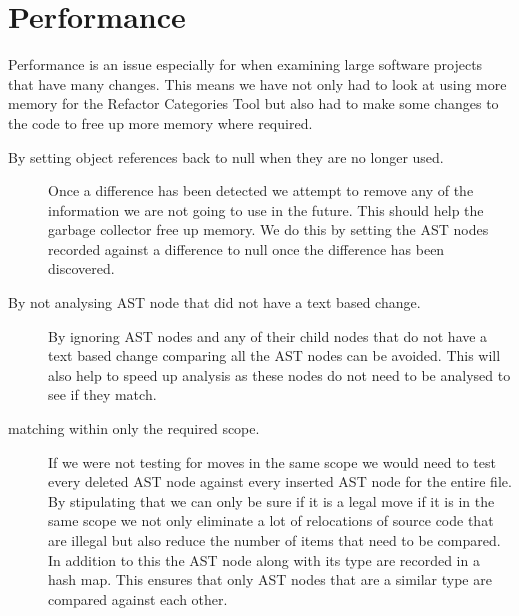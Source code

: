 


\section{Performance}
Performance is an issue especially for when examining large software projects that have many changes. This means we have not only had to look at using more memory for the Refactor Categories Tool but also had to make some changes to the code to free up more memory where required.

\begin{description}
 \item [By setting object references back to null when they are no longer used.]
  Once a difference has been detected we attempt to remove any of the information we are not going to use in the future.  This should help the garbage collector free up memory. We do this by setting the AST nodes recorded against a difference to null once the difference has been discovered. 
\item [By not analysing AST node that did not have a text based change.] 
  By ignoring AST nodes and any of their child nodes that do not have a text based change comparing all the AST nodes can be avoided.  This will also help to speed up analysis as these nodes do not need to be analysed to see if they match.
\item [matching within only the required scope.]
  If we were not testing for moves in the same scope we would need to test every deleted AST node against every inserted AST node for the entire file. By stipulating that we can only be sure if it is a legal move if it is in the same scope we not only eliminate a lot of relocations of source code that are illegal but also reduce the number of items that need to be compared. In addition to this the AST node along with its type are recorded in a hash map.  This ensures that only AST nodes that are a similar type are compared against each other.
\end{description}

